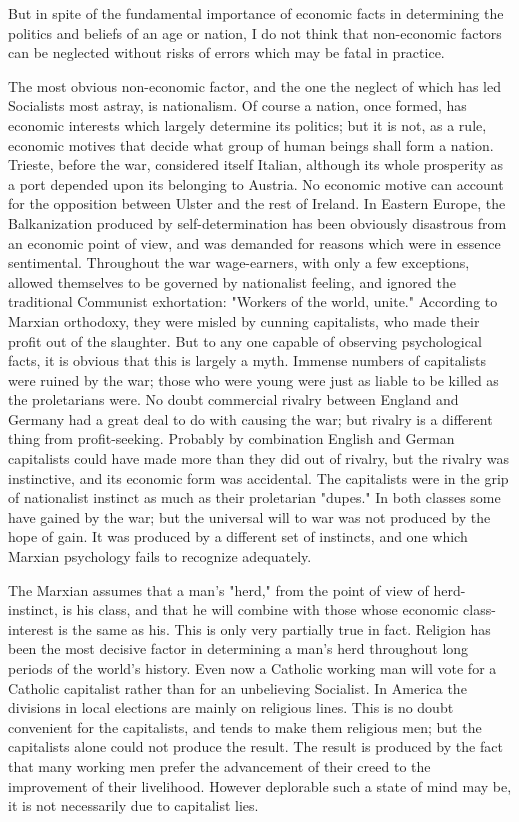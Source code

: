 But in spite of the fundamental importance of economic facts in determining the politics and beliefs of an age or nation, I do not think that non-economic factors can be neglected without risks of errors which may be fatal in practice.

The most obvious non-economic factor, and the one the neglect of which has led Socialists most astray, is nationalism. Of course a nation, once formed, has economic interests which largely determine its politics; but it is not, as a rule, economic motives that decide what group of human beings shall form a nation. Trieste, before the war, considered itself Italian, although its whole prosperity as a port depended upon its belonging to Austria. No economic motive can account for the opposition between Ulster and the rest of Ireland. In Eastern Europe, the Balkanization produced by self-determination has been obviously disastrous from an economic point of view, and was demanded for reasons which were in essence sentimental. Throughout the war wage-earners, with only a few exceptions, allowed themselves to be governed by nationalist feeling, and ignored the traditional Communist exhortation: "Workers of the world, unite." According to Marxian orthodoxy, they were misled by cunning capitalists, who made their profit out of the slaughter. But to any one capable of observing psychological facts, it is obvious that this is largely a myth. Immense numbers of capitalists were ruined by the war; those who were young were just as liable to be killed as the proletarians were. No doubt commercial rivalry between England and Germany had a great deal to do with causing the war; but rivalry is a different thing from profit-seeking. Probably by combination English and German capitalists could have made more than they did out of rivalry, but the rivalry was instinctive, and its economic form was accidental. The capitalists were in the grip of nationalist instinct as much as their proletarian "dupes." In both classes some have gained by the war; but the universal will to war was not produced by the hope of gain. It was produced by a different set of instincts, and one which Marxian psychology fails to recognize adequately.

The Marxian assumes that a man's "herd," from the point of view of herd-instinct, is his class, and that he will combine with those whose economic class-interest is the same as his. This is only very partially true in fact. Religion has been the most decisive factor in determining a man's herd throughout long periods of the world's history. Even now a Catholic working man will vote for a Catholic capitalist rather than for an unbelieving Socialist. In America the divisions in local elections are mainly on religious lines. This is no doubt convenient for the capitalists, and tends to make them religious men; but the capitalists alone could not produce the result. The result is produced by the fact that many working men prefer the advancement of their creed to the improvement of their livelihood. However deplorable such a state of mind may be, it is not necessarily due to capitalist lies.

